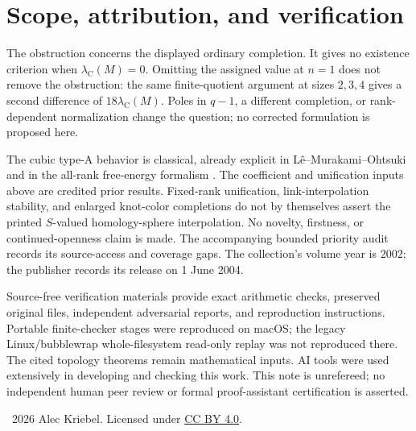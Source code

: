 \documentclass[11pt]{article}
\newcommand{\Cass}{\lambda_{\mathrm C}}
\begin{document}
\section{Scope, attribution, and verification}
The obstruction concerns the displayed ordinary completion.
It gives no existence criterion when $\Cass(M)=0$.
Omitting the assigned value at $n=1$ does not remove the obstruction:
the same finite-quotient argument at sizes $2,3,4$ gives a second
difference of $18\Cass(M)$.
Poles in $q-1$, a different completion, or rank-dependent normalization
change the question; no corrected formulation is proposed here.

The cubic type-A behavior is classical, already explicit in
L\^e--Murakami--Ohtsuki \cite[Proposition~5.3 and Remark~5.4]{LMO}
and in the all-rank free-energy formalism
\cite[\S3]{GLM}. The coefficient and unification inputs above are
credited prior results. Fixed-rank unification, link-interpolation
stability, and enlarged knot-color completions
\cite{BG,FZ,Fang} do not by themselves assert the printed
$S$-valued homology-sphere interpolation.
No novelty, firstness, or continued-openness claim is made.
The accompanying bounded priority audit records its source-access
and coverage gaps.
The collection's volume year is $2002$; the publisher records its
release on 1 June 2004.

Source-free verification materials provide exact arithmetic checks,
preserved original files, independent adversarial reports, and
reproduction instructions. Portable finite-checker stages were
reproduced on macOS; the legacy Linux/bubblewrap whole-filesystem
read-only replay was not reproduced there.
The cited topology theorems remain mathematical inputs.
AI tools were used extensively in developing and checking this work.
This note is unrefereed; no independent human peer review or formal
proof-assistant certification is asserted.

\smallskip
\noindent\textcopyright\ 2026 Alec Kriebel.
Licensed under \href{https://creativecommons.org/licenses/by/4.0/}{CC BY 4.0}.
\end{document}

